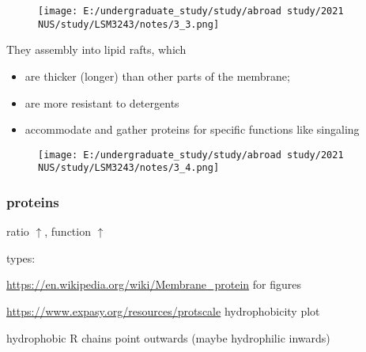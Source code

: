 \documentclass[]{article}
\begin{document}
\begin{figure}
\centering
\texttt{[image: E:/undergraduate\_study/study/abroad study/2021 NUS/study/LSM3243/notes/3\_3.png]}
\caption{}
\end{figure}

They assembly into lipid rafts, which

\begin{itemize}
\item
  are thicker (longer) than other parts of the membrane;
\item
  are more resistant to detergents
\item
  accommodate and gather proteins for specific functions like singaling
\end{itemize}

\begin{figure}
\centering
\texttt{[image: E:/undergraduate\_study/study/abroad study/2021 NUS/study/LSM3243/notes/3\_4.png]}
\caption{}
\end{figure}

\hypertarget{proteins}{%
\subsubsection{proteins}\label{proteins}}

ratio \(\uparrow\), function \(\uparrow\)

types:

\url{https://en.wikipedia.org/wiki/Membrane_protein} for figures

\url{https://www.expasy.org/resources/protscale} hydrophobicity plot

hydrophobic R chains point outwards (maybe hydrophilic inwards)
\end{document}
